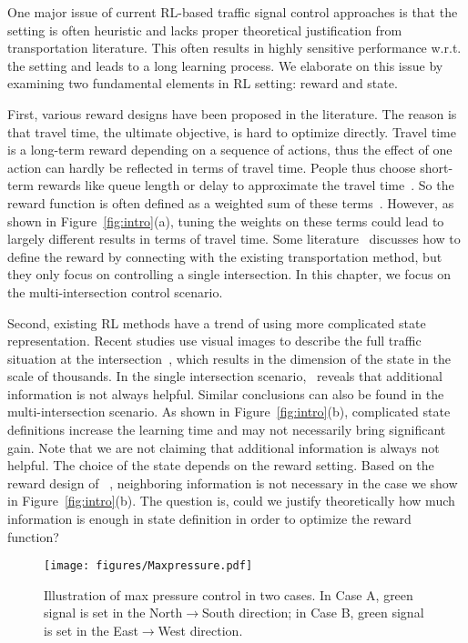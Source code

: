 One major issue of current RL-based traffic signal control approaches is that the setting is often heuristic and lacks proper theoretical justification from transportation literature. This often results in highly sensitive performance w.r.t. the setting and leads to a long learning process. We elaborate on this issue by examining two fundamental elements in RL setting: reward and state.

First, various reward designs have been proposed in the literature. The reason is that travel time, the ultimate objective, is hard to optimize directly. Travel time is a long-term reward depending on a sequence of actions, thus the effect of one action can hardly be reflected in terms of travel time. People thus choose short-term rewards like queue length or delay to approximate the travel time~\cite{hua19survey}. So the reward function is often defined as a weighted sum of these terms~\cite{VaOl16,BPT14,ElAb10,ElAA13,wei2018intellilight}. However, as shown in Figure~\ref{fig:intro}(a), tuning the weights on these terms could lead to largely different results in terms of travel time. Some literature~\cite{ZZXW+19} discusses how to define the reward by connecting with the existing transportation method, but they only focus on controlling a single intersection. In this chapter, we focus on the multi-intersection control scenario. 

Second, existing RL methods have a trend of using more complicated state representation. Recent studies use visual images to describe the full traffic situation at the intersection~\cite{VaOl16,wei2018intellilight}, which results in the dimension of the state in the scale of thousands. In the single intersection scenario,~\cite{ZZXW+19} reveals that additional information is not always helpful. Similar conclusions can also be found in the multi-intersection scenario. As shown in Figure~\ref{fig:intro}(b), complicated state definitions increase the learning time and may not necessarily bring significant gain. Note that we are not claiming that additional information is always not helpful. The choice of the state depends on the reward setting. Based on the reward design of \LIT~\cite{ZZXW+19}, neighboring information is not necessary in the case we show in Figure~\ref{fig:intro}(b). The question is, could we justify theoretically how much information is enough in state definition in order to optimize the reward function?


\begin{figure}
    \centering
    \texttt{[image: figures/Maxpressure.pdf]}
    \caption{Illustration of max pressure control in two cases. In Case A, green signal is set in the North$\rightarrow$South direction; in Case B, green signal is set in the East$\rightarrow$West direction.}
    \label{fig:pressure}
    \vspace{-2mm}
\end{figure}

